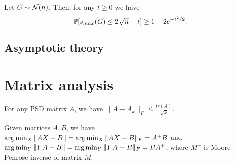 \begin{thm}
\label{rmt_smax_concen}
Let $G\sim\mathcal{N}(n)$. Then, for any $t\ge 0$ we have
\[
\mathbb{P}[s_{max}(G)\le 2\sqrt{n}+t]\ge 1-2e^{-t^2/2}.
\]
\end{thm}
\pfsk{\ref{rmt_smax_concen}}{
    
}



\subsection{Asymptotic theory}

\section{Matrix analysis}
\begin{lem}
    \label{lra_tr_bound}
For any PSD matrix $A$, we have $\|A-A_k\|_F\le\frac{tr(A)}{\sqrt{k}}$.  
\end{lem}

\begin{lem}
\label{proj}
Given matrices $A,B$, we have $\arg\min_X\|AX-B\|=\arg\min_X\|AX-B\|_F=A^+B$ and  $\arg\min_Y\|YA-B\|=\arg\min_Y\|YA-B\|_F=BA^+$,
where $M^+$ is Moore–Penrose inverse of matrix $M$.
\end{lem}
